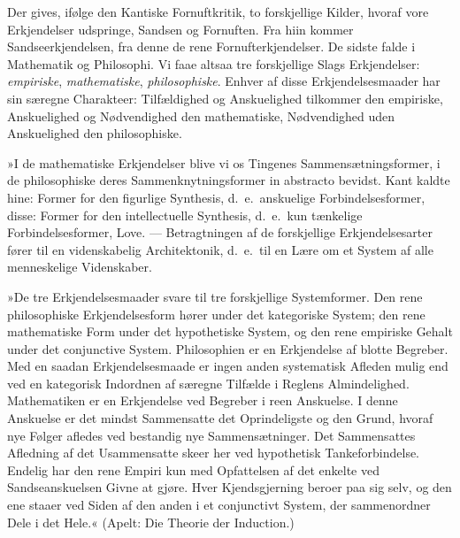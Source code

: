 \documentclass[12pt]{book}
\newcommand{\apage}[1]{\marginnote{\footnotesize\textit{[#1]}}}
\begin{document}
Der gives, ifølge den Kantiske Fornuftkritik, to forskjellige Kilder,
hvoraf vore Erkjendelser udspringe, Sandsen og Fornuften. Fra hiin kommer
Sandseerkjendelsen, fra denne de rene Fornufterkjendelser. De sidste falde
i Mathematik og Philosophi. Vi faae altsaa tre forskjellige Slags
Erkjendelser: \emph{empiriske}, \emph{mathematiske}, \emph{philosophiske}. Enhver af disse
Erkjendelsesmaader har sin særegne Charakteer: Tilfældighed og Anskuelighed
tilkommer den empiriske, Anskuelighed og Nødvendighed den mathematiske,
Nødvendighed uden Anskuelighed den philosophiske.

»I de mathematiske Erkjendelser blive vi os Tingenes Sammensætningsformer,
i de philosophiske deres Sammenknytningsformer in abstracto
bevidst. Kant kaldte hine: Former for den figurlige Synthesis, d.\ e.\
anskuelige Forbindelsesformer, disse: Former for den intellectuelle
Synthesis, d.\ e.\ kun tænkelige Forbindelsesformer, Love. --- Betragtningen
af de forskjellige Erkjendelsesarter fører til en videnskabelig
Architektonik, d.\ e.\ til en Lære om et System af alle menneskelige
Videnskaber.

»De tre Erkjendelsesmaader svare til tre forskjellige
Systemformer. Den rene philosophiske Erkjendelsesform hører under det
kategoriske System; den rene mathematiske Form under det hypothetiske
System, og den rene empiriske Gehalt under det conjunctive System. \apage{83} 
Philosophien er en Erkjendelse af blotte Begreber. Med en saadan
Erkjendelsesmaade er ingen anden systematisk Afleden mulig end ved en
kategorisk Indordnen af særegne Tilfælde i Reglens Almindelighed.
Mathematiken er en Erkjendelse ved Begreber i reen Anskuelse. I denne
Anskuelse er det mindst Sammensatte det Oprindeligste og den Grund, hvoraf
nye Følger afledes ved bestandig nye Sammensætninger. Det Sammensattes
Afledning af det Usammensatte skeer her ved hypothetisk Tankeforbindelse.
Endelig har den rene Empiri kun med Opfattelsen af det enkelte ved
Sandseanskuelsen Givne at gjøre. Hver Kjendsgjerning beroer paa sig selv,
og den ene staaer ved Siden af den anden i et conjunctivt System, der
sammenordner Dele i det Hele.« (Apelt: Die Theorie der Induction.)
\end{document}
